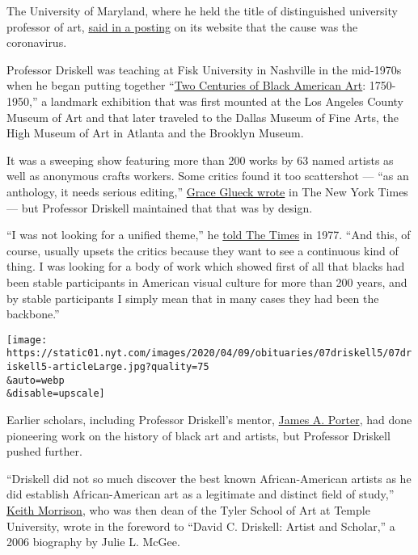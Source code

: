 The University of Maryland, where he held the title of distinguished
university professor of art,
\href{https://arhu.umd.edu/news/david-c-driskell-african-american-art-pioneer-dies-88}{said
in a posting} on its website that the cause was the coronavirus.

Professor Driskell was teaching at Fisk University in Nashville in the
mid-1970s when he began putting together
``\href{https://www.lacma.org/art/exhibition/two-centuries-black-american-art}{Two
Centuries of Black American Art}: 1750-1950,'' a landmark exhibition
that was first mounted at the Los Angeles County Museum of Art and that
later traveled to the Dallas Museum of Fine Arts, the High Museum of Art
in Atlanta and the Brooklyn Museum.

It was a sweeping show featuring more than 200 works by 63 named artists
as well as anonymous crafts workers. Some critics found it too
scattershot --- ``as an anthology, it needs serious editing,''
\href{https://www.nytimes.com/1977/06/24/archives/2-centuries-of-black-art-at-brooklyn-two-centuries-of-black-art.html?searchResultPosition=1}{Grace
Glueck wrote} in The New York Times --- but Professor Driskell
maintained that that was by design.

``I was not looking for a unified theme,'' he
\href{https://www.nytimes.com/1977/06/29/archives/black-art-label-disputed-by-curator.html?searchResultPosition=1}{told
The Times} in 1977. ``And this, of course, usually upsets the critics
because they want to see a continuous kind of thing. I was looking for a
body of work which showed first of all that blacks had been stable
participants in American visual culture for more than 200 years, and by
stable participants I simply mean that in many cases they had been the
backbone.''

\texttt{[image: https://static01.nyt.com/images/2020/04/09/obituaries/07driskell5/07driskell5-articleLarge.jpg?quality=75\\\&auto=webp\\\&disable=upscale]}

Earlier scholars, including Professor Driskell's mentor,
\href{https://americanart.si.edu/artist/james-porter-3843}{James A.
Porter}, had done pioneering work on the history of black art and
artists, but Professor Driskell pushed further.

``Driskell did not so much discover the best known African-American
artists as he did establish African-American art as a legitimate and
distinct field of study,''
\href{http://keithmorrison.com/?page_id=207}{Keith Morrison}, who was
then dean of the Tyler School of Art at Temple University, wrote in the
foreword to ``David C. Driskell: Artist and Scholar,'' a 2006 biography
by Julie L. McGee.

